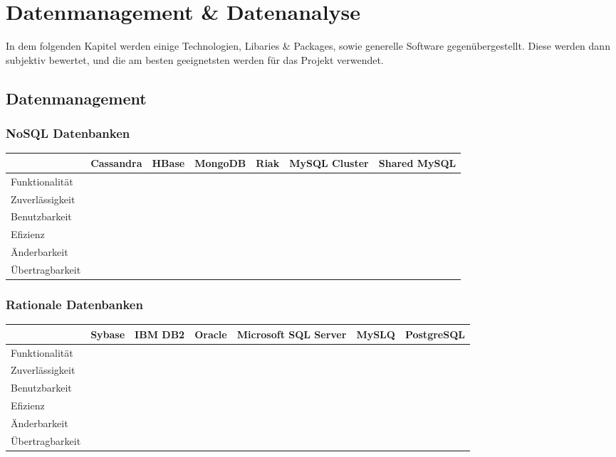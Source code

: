 \chapter{Datenmanagement \& Datenanalyse}

In dem folgenden Kapitel werden einige Technologien, Libaries & Packages, sowie generelle Software gegenübergestellt. Diese werden dann subjektiv bewertet, und die am besten geeignetsten werden für das Projekt verwendet.

\section{Datenmanagement}

	\subsection{NoSQL Datenbanken}

		\begin{tabular} {| l | c | c | c | c | c | c |}
			\hline
			& Cassandra & HBase & MongoDB & Riak & MySQL Cluster & Shared MySQL		\\ \hline \hline
			Funktionalität &  &	 &  &  &  &  &		\\ \hline
			Zuverlässigkeit &  &	 &  &  &  &  &	 			\\ \hline
			Benutzbarkeit &  &	 &  &  &  &  &	 		\\ \hline
			Efizienz &  &	 &  &  &  &  &			\\ \hline
			Änderbarkeit &  &  &  &  &  &  &		\\ \hline 
			Übertragbarkeit	&  &	&  &  &  &  &					\\ \hline
		\end{tabular}

	\subsection{Rationale Datenbanken}
		
		\begin{tabular} {| l | c | c | c | c | c | c |}
			\hline
			& Sybase & IBM DB2 & Oracle & Microsoft SQL Server & MySLQ & PostgreSQL	\\ \hline \hline
			Funktionalität &  &	 &  &  &  &  &		\\ \hline
			Zuverlässigkeit &  &	 &  &  &  &  &	 			\\ \hline
			Benutzbarkeit &  &	 &  &  &  &  &	 		\\ \hline
			Efizienz &  &	 &  &  &  &  &			\\ \hline
			Änderbarkeit &  &  &  &  &  &  &		\\ \hline 
			Übertragbarkeit	&  &	&  &  &  &  &					\\ \hline
		\end{tabular}

